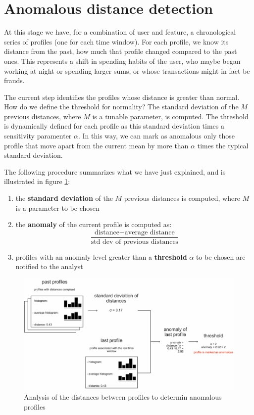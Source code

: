 \section{Anomalous distance detection}

At this stage we have, for a combination of user and feature, a chronological series of profiles (one for each time window). For each profile, we know its distance from the past, how much that profile changed compared to the past ones. This represents a shift in spending habits of the user, who maybe began working at night or spending larger sums, or whose transactions might in fact be frauds.

The current step identifies the profiles whose distance is greater than normal. How do we define the threshold for normality? The standard deviation of the $M$ previous distances, where $M$ is a tunable parameter, is computed. The threshold is dynamically defined for each profile as this standard deviation times a sensitivity paramenter $\alpha$. In this way, we can mark as anomalous only those profile that move apart from the current mean by more than $\alpha$ times the typical standard deviation.

The following procedure summarizes what we have just explained, and is illustrated in figure \ref{fig:distance_analysis}:

\begin{enumerate}
  \item the \textbf{standard deviation} of the $M$ previous distances is computed, where $M$ is a parameter to be chosen
  \item the \textbf{anomaly} of the current profile is computed as:
    \begin{displaymath}
      \frac{\text{distance}-\text{average distance}}{\text{std dev of previous distances}}
    \end{displaymath}
  \item profiles with an anomaly level greater than a \textbf{threshold} $\alpha$ to be chosen are notified to the analyst
\end{enumerate}

\begin{figure}[h]
\centering
\includegraphics[width=450]{images/distance_analysis.pdf}
\caption{Analysis of the distances between profiles to determin anomalous profiles}
\label{fig:distance_analysis}
\end{figure}

